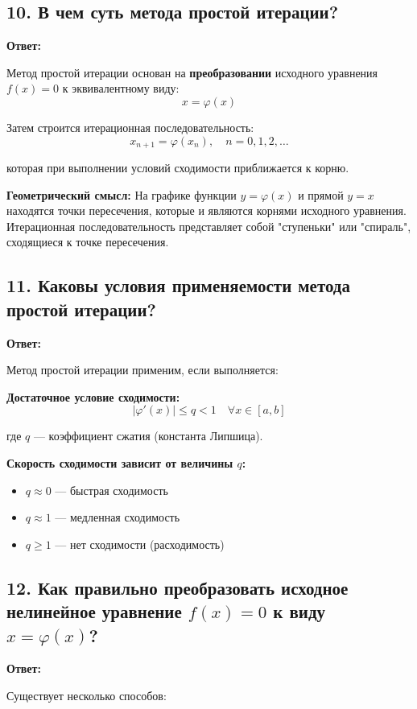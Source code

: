 \documentclass[a4paper,12pt]{article}
\begin{document}
\subsection*{10. В чем суть метода простой итерации?}

\textbf{Ответ:} 

Метод простой итерации основан на \textbf{преобразовании} исходного уравнения $f(x) = 0$ к эквивалентному виду:
\[
    x = \varphi(x)
\]

Затем строится итерационная последовательность:
\[
    x_{n+1} = \varphi(x_n), \quad n = 0, 1, 2, \ldots
\]

которая при выполнении условий сходимости приближается к корню.

\textbf{Геометрический смысл:} На графике функции $y = \varphi(x)$ и прямой $y = x$ находятся точки пересечения, которые и являются корнями исходного уравнения. Итерационная последовательность представляет собой "ступеньки" или "спираль", сходящиеся к точке пересечения.

\subsection*{11. Каковы условия применяемости метода простой итерации?}

\textbf{Ответ:} 

Метод простой итерации применим, если выполняется:

\textbf{Достаточное условие сходимости:}
\[
    |\varphi'(x)| \leq q < 1 \quad \forall x \in [a, b]
\]

где $q$ --- коэффициент сжатия (константа Липшица).

\textbf{Скорость сходимости зависит от величины $q$:}
\begin{itemize}
    \item $q \approx 0$ --- быстрая сходимость
    \item $q \approx 1$ --- медленная сходимость
    \item $q \geq 1$ --- нет сходимости (расходимость)
\end{itemize}

\subsection*{12. Как правильно преобразовать исходное нелинейное уравнение $f(x) = 0$ к виду $x = \varphi(x)$?}

\textbf{Ответ:} 

Существует несколько способов:
\end{document}

